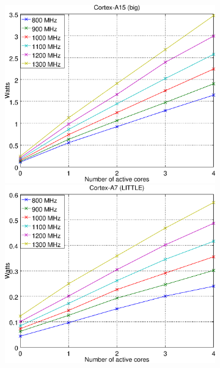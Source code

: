 \begin{figure}
  \centering
    \begin{subfigure}{0.49\textwidth}
      \centering
      \includegraphics[width=1\linewidth]{Plots/Modelos_consumo/odroid_big.eps}

      \vspace{1cm}

      \includegraphics[width=1\linewidth]{Plots/Modelos_consumo/odroid_little.eps}
      \caption{\odroid}
      \label{fig:modelo_consumo-odroid}


\end{subfigure}
\end{figure}
